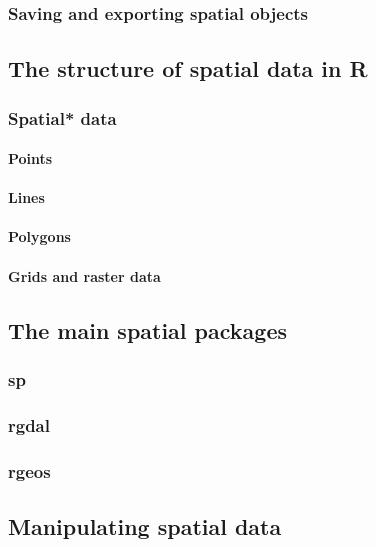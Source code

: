 \documentclass[]{article}
\begin{document}
\subsubsection{Saving and exporting spatial objects}

\subsection{The structure of spatial data in R}

\subsubsection{Spatial* data}

\paragraph{Points}

\paragraph{Lines}

\paragraph{Polygons}

\paragraph{Grids and raster data}

\subsection{The main spatial packages}

\subsubsection{sp}

\subsubsection{rgdal}

\subsubsection{rgeos}

\subsection{Manipulating spatial data}
\end{document}
